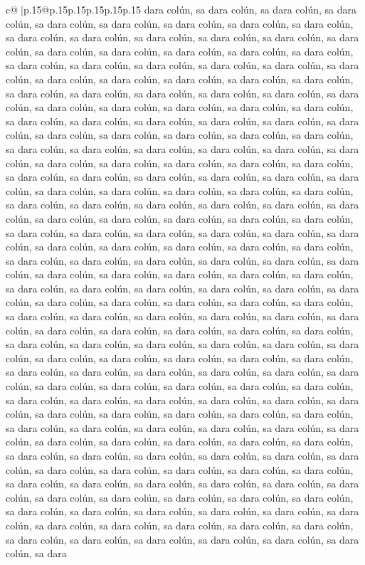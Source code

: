\documentclass{article}
\begin{document}
{\begin{supertabular}{c@{$\;$}|p{.15\linewidth}@{}p{.15\linewidth}p{.15\linewidth}p{.15\linewidth}p{.15\linewidth}p{.15\linewidth}}
{{{dara colún, sa dara colún, sa dara colún, sa dara colún, sa dara colún, sa dara colún, sa dara colún, sa dara colún, sa dara colún, sa dara colún, sa dara colún, sa dara colún, sa dara colún, sa dara colún, sa dara colún, sa dara colún, sa dara colún, sa dara colún, sa dara colún, sa dara colún, sa dara colún, sa dara colún, sa dara colún, sa dara colún, sa dara colún, sa dara colún, sa dara colún, sa dara colún, sa dara colún, sa dara colún, sa dara colún, sa dara colún, sa dara colún, sa dara colún, sa dara colún, sa dara colún, sa dara colún, sa dara colún, sa dara colún, sa dara colún, sa dara colún, sa dara colún, sa dara colún, sa dara colún, sa dara colún, sa dara colún, sa dara colún, sa dara colún, sa dara colún, sa dara colún, sa dara colún, sa dara colún, sa dara colún, sa dara colún, sa dara colún, sa dara colún, sa dara colún, sa dara colún, sa dara colún, sa dara colún, sa dara colún, sa dara colún, sa dara colún, sa dara colún, sa dara colún, sa dara colún, sa dara colún, sa dara colún, sa dara colún, sa dara colún, sa dara colún, sa dara colún, sa dara colún, sa dara colún, sa dara colún, sa dara colún, sa dara colún, sa dara colún, sa dara colún, sa dara colún, sa dara colún, sa dara colún, sa dara colún, sa dara colún, sa dara colún, sa dara colún, sa dara colún, sa dara colún, sa dara colún, sa dara colún, sa dara colún, sa dara colún, sa dara colún, sa dara colún, sa dara colún, sa dara colún, sa dara colún, sa dara colún, sa dara colún, sa dara colún, sa dara colún, sa dara colún, sa dara colún, sa dara colún, sa dara colún, sa dara colún, sa dara colún, sa dara colún, sa dara colún, sa dara colún, sa dara colún, sa dara colún, sa dara colún, sa dara colún, sa dara colún, sa dara colún, sa dara colún, sa dara colún, sa dara colún, sa dara colún, sa dara colún, sa dara colún, sa dara colún, sa dara colún, sa dara colún, sa dara colún, sa dara colún, sa dara colún, sa dara colún, sa dara colún, sa dara colún, sa dara colún, sa dara colún, sa dara colún, sa dara colún, sa dara colún, sa dara colún, sa dara colún, sa dara colún, sa dara colún, sa dara colún, sa dara colún, sa dara colún, sa dara colún, sa dara colún, sa dara colún, sa dara colún, sa dara colún, sa dara colún, sa dara colún, sa dara colún, sa dara colún, sa dara colún, sa dara colún, sa dara colún, sa dara colún, sa dara colún, sa dara colún, sa dara colún, sa dara colún, sa dara colún, sa dara colún, sa dara colún, sa dara colún, sa dara colún, sa dara colún, sa dara colún, sa dara colún, sa dara colún, sa dara colún, sa dara colún, sa dara colún, sa dara colún, sa dara colún, sa dara colún, sa dara colún, sa dara colún, sa dara colún, sa dara colún, sa dara colún, sa dara colún, sa dara colún, sa dara colún, sa dara colún, sa dara colún, sa dara colún, sa dara colún, sa dara colún, sa dara colún, sa dara colún, sa dara colún, sa dara colún, sa dara colún, sa dara colún, sa dara colún, sa dara colún, sa dara colún, sa dara colún, sa dara colún, sa dara colún, sa dara colún, sa dara colún, sa dara colún, sa dara colún, sa dara colún, sa dara colún, sa dara colún, sa dara colún, sa dara colún, sa dara colún, sa dara colún, sa dara colún, sa dara colún, sa dara }}}
\end{supertabular}}
\end{document}

